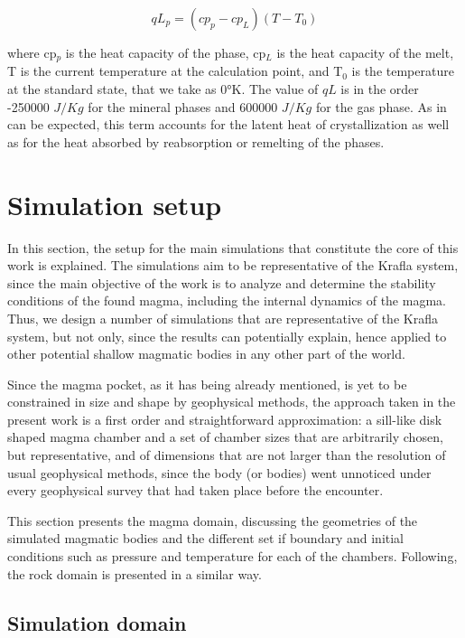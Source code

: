 \begin{equation}
	qL_p = (cp_p-cp_L)(T-T_0)
\end{equation}

where cp$_p$ is the heat capacity of the phase, cp$_L$ is the heat capacity of the melt, T is the current temperature at the calculation point, and T$_0$ is the temperature at the standard state, that we take as 0°K. The value of $qL$ is in the order -250000 $J/Kg$ for the mineral phases and 600000 $J/Kg$ for the gas phase. As in can be expected, this term accounts for the latent heat of crystallization as well as for the heat absorbed by reabsorption or remelting of the phases.


\section{Simulation setup}
In this section, the setup for the main simulations that constitute the core of this work is explained. The simulations aim to be representative of the Krafla system, since the main objective of the work is to analyze and determine the stability conditions of the found magma, including the internal dynamics of the magma. Thus, we design a number of simulations that are representative of the Krafla system, but not only, since the results can potentially explain, hence applied to other potential shallow magmatic bodies in any other part of the world. 

Since the magma pocket, as it has being already mentioned, is yet to be constrained in size and shape by geophysical methods, the approach taken in the present work is a first order and straightforward approximation: a sill-like disk shaped magma chamber and a set of chamber sizes that are arbitrarily chosen, but representative, and of dimensions that are not larger than the resolution of usual geophysical methods, since the body (or bodies) went unnoticed under every geophysical survey that had taken place before the encounter. 

This section presents the magma domain, discussing the geometries of the simulated magmatic bodies and the different set if boundary and initial conditions such as pressure and temperature for each of the chambers. Following, the rock domain is presented in a similar way.
\subsection{Simulation domain}
